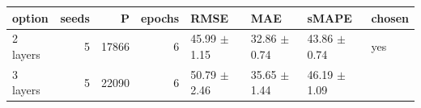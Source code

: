 \begin{tabular}{lrrrllll}
\toprule
option & seeds & P & epochs & RMSE & MAE & sMAPE & chosen \\
\midrule
2 layers & 5 & 17866 & 6 & 45.99 $\pm$ 1.15 & 32.86 $\pm$ 0.74 & 43.86 $\pm$ 0.74 & yes \\
3 layers & 5 & 22090 & 6 & 50.79 $\pm$ 2.46 & 35.65 $\pm$ 1.44 & 46.19 $\pm$ 1.09 &  \\
\bottomrule
\end{tabular}
